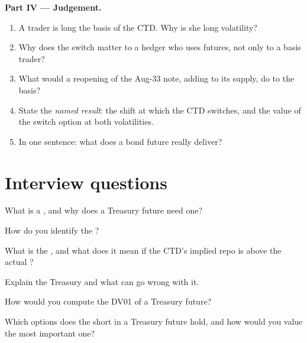 \begin{problem}
\medskip\noindent\textbf{Part IV --- Judgement.}
\begin{enumerate}[resume]
\item A trader is long the basis of the CTD. Why is she long volatility?
\item Why does the switch matter to a hedger who uses futures, not only to a
basis trader?
\item What would a reopening of the Aug-33 note, adding to its supply, do to
the basis?
\item State the \emph{named result}: the shift at which the CTD switches, and
the value of the switch option at both volatilities.
\item In one sentence: what does a bond future really deliver?
\end{enumerate}
\end{problem}

\section{Interview questions}

\begin{interviewq}\label{iq:m2:bond-futures:1}
What is a , and why does a Treasury future need one?
\end{interviewq}

\begin{interviewq}\label{iq:m2:bond-futures:2}
How do you identify the ?
\end{interviewq}

\begin{interviewq}\label{iq:m2:bond-futures:3}
What is the , and what does it mean if the CTD's implied repo
is above the actual ?
\end{interviewq}

\begin{interviewq}\label{iq:m2:bond-futures:4}
Explain the Treasury  and what can go wrong with it.
\end{interviewq}

\begin{interviewq}\label{iq:m2:bond-futures:5}
How would you compute the DV01 of a Treasury future?
\end{interviewq}

\begin{interviewq}\label{iq:m2:bond-futures:6}
Which options does the short in a Treasury future hold, and how would you
value the most important one?
\end{interviewq}

